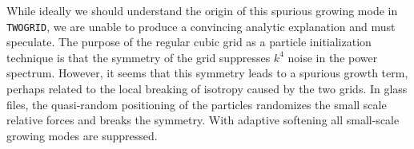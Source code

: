 \documentclass[a4paper,11pt]{article}
\newcommand{\YF}[1]{\textcolor{green}{[\bf YF: #1]} }
\begin{document}
While ideally we should understand the origin of this spurious growing mode in \texttt{TWOGRID}, we are unable to produce a convincing analytic explanation and must speculate. The purpose of the regular cubic grid as a particle initialization technique is that the symmetry of the grid suppresses $k^4$ noise in the power spectrum. However, it seems that this symmetry leads to a spurious growth term, perhaps related to the local breaking of isotropy caused by the two grids.
In glass files, the quasi-random positioning of the particles randomizes the small scale relative forces and breaks the symmetry. With adaptive softening all small-scale growing modes are suppressed.




\end{document}
